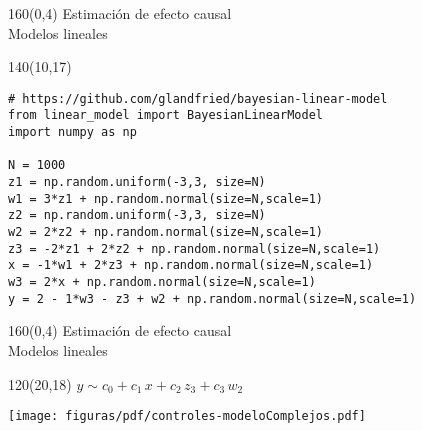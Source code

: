 \documentclass[shownotes,aspectratio=169]{beamer}
\begin{document}
\begin{frame}
\begin{textblock}{160}(0,4)
 \centering \LARGE Estimación de efecto causal\\
 \large Modelos lineales
 \end{textblock}
 \vspace{0.75cm}


\begin{textblock}{140}(10,17) \normalsize
\begin{lstlisting}
# https://github.com/glandfried/bayesian-linear-model
from linear_model import BayesianLinearModel
import numpy as np

N = 1000
z1 = np.random.uniform(-3,3, size=N)
w1 = 3*z1 + np.random.normal(size=N,scale=1)
z2 = np.random.uniform(-3,3, size=N)
w2 = 2*z2 + np.random.normal(size=N,scale=1)
z3 = -2*z1 + 2*z2 + np.random.normal(size=N,scale=1)
x = -1*w1 + 2*z3 + np.random.normal(size=N,scale=1)
w3 = 2*x + np.random.normal(size=N,scale=1)
y = 2 - 1*w3 - z3 + w2 + np.random.normal(size=N,scale=1)
\end{lstlisting}
\end{textblock}
\end{frame}


\begin{frame}
\begin{textblock}{160}(0,4)
 \centering \LARGE Estimación de efecto causal\\
 \large Modelos lineales
 \end{textblock}
 \vspace{0.75cm}



\begin{textblock}{120}(20,18) \centering
$y \sim c_0 + c_1\,x + c_2\,z_3 + c_3\,w_2$

\texttt{[image: figuras/pdf/controles-modeloComplejos.pdf]}
\end{textblock}


\end{frame}
\end{document}

